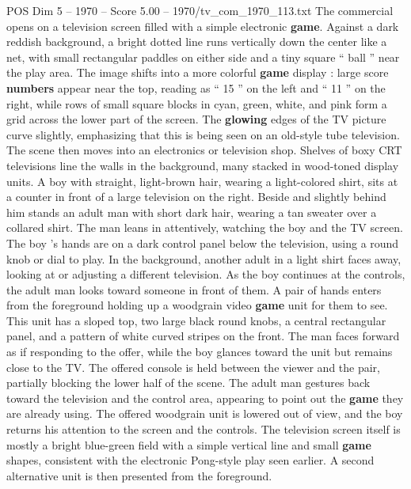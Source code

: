 \begin{textsample}{POS Dim 5 – 1970 – Score 5.00 – 1970/tv\_com\_1970\_113.txt}  \label{ex:f5_pos_089}
The commercial opens on a television screen filled with a simple electronic \textbf{game}.
Against a dark reddish background, a bright dotted line runs vertically down the center like a net, with small rectangular paddles on either side and a tiny square “ ball ” near the play area.
The image shifts into a more colorful \textbf{game} display : large score \textbf{numbers} appear near the top, reading as “ 15 ” on the left and “ 11 ” on the right, while rows of small square blocks in cyan, green, white, and pink form a grid across the lower part of the screen.
The \textbf{glowing} edges of the TV picture curve slightly, emphasizing that this is being seen on an old-style tube television.
The scene then moves into an electronics or television shop.
Shelves of boxy CRT televisions line the walls in the background, many stacked in wood-toned display units.
A boy with straight, light-brown hair, wearing a light-colored shirt, sits at a counter in front of a large television on the right.
Beside and slightly behind him stands an adult man with short dark hair, wearing a tan sweater over a collared shirt.
The man leans in attentively, watching the boy and the TV screen.
The boy ’s hands are on a dark control panel below the television, using a round knob or dial to play.
In the background, another adult in a light shirt faces away, looking at or adjusting a different television.
As the boy continues at the controls, the adult man looks toward someone in front of them.
A pair of hands enters from the foreground holding up a woodgrain video \textbf{game} unit for them to see.
This unit has a sloped top, two large black round knobs, a central rectangular panel, and a pattern of white curved stripes on the front.
The man faces forward as if responding to the offer, while the boy glances toward the unit but remains close to the TV.
The offered console is held between the viewer and the pair, partially blocking the lower half of the scene.
The adult man gestures back toward the television and the control area, appearing to point out the \textbf{game} they are already using.
The offered woodgrain unit is lowered out of view, and the boy returns his attention to the screen and the controls.
The television screen itself is mostly a bright blue-green field with a simple vertical line and small \textbf{game} shapes, consistent with the electronic Pong-style play seen earlier.
A second alternative unit is then presented from the foreground.

\end{textsample}
